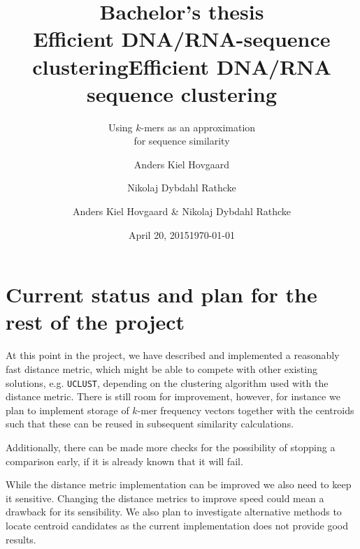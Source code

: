 \documentclass[11pt, a4paper]{article}
\title{Bachelor's thesis \\
       \vspace{2mm}
       {\LARGE Efficient DNA/RNA-sequence clustering}}
\author{Anders Kiel Hovgaard \and Nikolaj Dybdahl Rathcke}
\date{April 20, 2015}
\title{Efficient DNA/RNA sequence clustering}
\subtitle{Using $k$-mers as an approximation\\for sequence similarity}
\author{Anders Kiel Hovgaard \& Nikolaj Dybdahl Rathcke}
\date{\today}
\begin{document}
\begin{titlepage}
  \maketitle
\end{titlepage}


\thispagestyle{plain}
\newpage

\tableofcontents
\thispagestyle{plain}
\newpage

\thispagestyle{fancy}






\section{Current status and plan for the rest of the project}

At this point in the project, we have described and implemented a reasonably
fast distance metric, which might be able to compete with other existing
solutions, e.g. \texttt{UCLUST}, depending on the clustering algorithm used
with the distance metric. There is still room for improvement, however, for
instance we plan to implement storage of $k$-mer frequency vectors together
with the centroids such that these can be reused in subsequent similarity
calculations.

Additionally, there can be made more checks for the possibility of stopping a
comparison early, if it is already known that it will fail.

While the distance metric implementation can be improved we also need to keep
it sensitive. Changing the distance metrics to improve speed could mean a
drawback for its sensibility. We also plan to investigate alternative methods
to locate centroid candidates as the current implementation does not provide
good results.


\newpage

\end{document}
